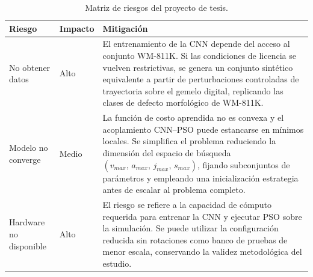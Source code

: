 \documentclass[11pt]{article}
\begin{document}
\begingroup
\small
\setlength{\tabcolsep}{6pt}
\renewcommand{\arraystretch}{1.5}
\begin{longtable}{L{3.8cm} L{2.2cm} L{6.5cm}}
\caption{Matriz de riesgos del proyecto de tesis.}
\label{tab:riesgos} \\
\toprule
\textbf{Riesgo} & \textbf{Impacto} & \textbf{Mitigación} \\
\midrule
\endhead
\bottomrule
\endlastfoot

No obtener datos &
Alto &
El entrenamiento de la CNN depende del acceso al conjunto WM-811K. Si las condiciones de licencia se vuelven restrictivas, se genera un conjunto sintético equivalente a partir de perturbaciones controladas de trayectoria sobre el gemelo digital, replicando las clases de defecto morfológico de WM-811K. \\[4pt]

Modelo no converge &
Medio &
La función de costo aprendida no es convexa y el acoplamiento CNN--PSO puede estancarse en mínimos locales. Se simplifica el problema reduciendo la dimensión del espacio de búsqueda $(v_{max},\, a_{max},\, j_{max},\, s_{max})$, fijando subconjuntos de parámetros y empleando una inicialización estrategia antes de escalar al problema completo. \\[4pt]

Hardware no disponible &
Alto &
El riesgo se refiere a la capacidad de cómputo requerida para entrenar la CNN y ejecutar PSO sobre la simulación. Se puede utilizar la configuración reducida sin rotaciones como banco de pruebas de menor escala, conservando la validez metodológica del estudio. \\[4pt]

\end{longtable}
\endgroup
\end{document}
